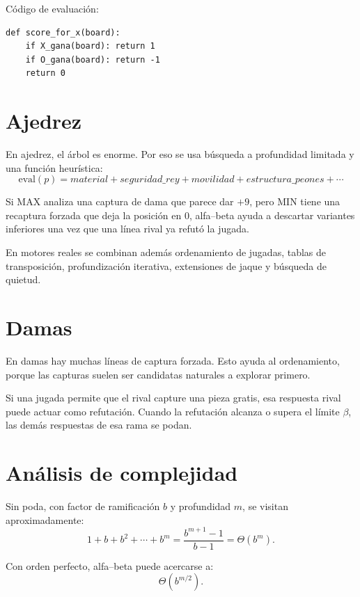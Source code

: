 \documentclass[11pt,a4paper]{article}
\theoremstyle{definition}
\begin{document}
Código de evaluación:
\begin{lstlisting}[style=pythonSoft]
def score_for_x(board):
    if X_gana(board): return 1
    if O_gana(board): return -1
    return 0
\end{lstlisting}

\section{Ajedrez}

En ajedrez, el árbol es enorme. Por eso se usa búsqueda a profundidad limitada y una función heurística:
\[
\text{eval}(p)= material + seguridad\_rey + movilidad + estructura\_peones + \cdots
\]

\begin{examplebox}
Si MAX analiza una captura de dama que parece dar $+9$, pero MIN tiene una recaptura forzada que deja la posición en $0$, alfa--beta ayuda a descartar variantes inferiores una vez que una línea rival ya refutó la jugada.
\end{examplebox}

En motores reales se combinan además ordenamiento de jugadas, tablas de transposición, profundización iterativa, extensiones de jaque y búsqueda de quietud.

\section{Damas}

En damas hay muchas líneas de captura forzada. Esto ayuda al ordenamiento, porque las capturas suelen ser candidatas naturales a explorar primero.

\begin{examplebox}
Si una jugada permite que el rival capture una pieza gratis, esa respuesta rival puede actuar como refutación. Cuando la refutación alcanza o supera el límite $\beta$, las demás respuestas de esa rama se podan.
\end{examplebox}

\section{Análisis de complejidad}

Sin poda, con factor de ramificación $b$ y profundidad $m$, se visitan aproximadamente:
\[
1+b+b^2+\cdots+b^m = \frac{b^{m+1}-1}{b-1}=\Theta(b^m).
\]

Con orden perfecto, alfa--beta puede acercarse a:
\[
\Theta(b^{m/2}).
\]
\end{document}
